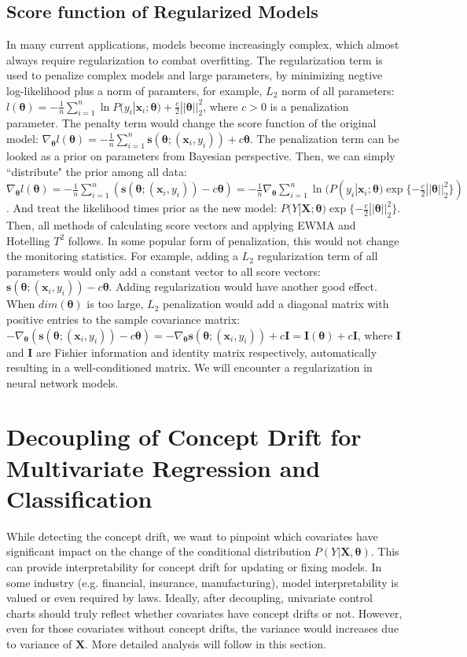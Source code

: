 \documentclass[twoside,11pt]{article}
\begin{document}
\subsection{Score function of Regularized Models}
\label{ss:score_regu}
In many current applications, models become increasingly complex, which almost always require regularization to combat overfitting. The regularization term is used to penalize complex models and large parameters, by minimizing negtive log-likelihood plus a norm of paramters, for example, $L_2$ norm of all parameters: $l(\bm{\theta})=-\frac{1}{n}\sum_{i=1}^n \ln P(y_i|\bm{x}_i;\bm{\theta})+\frac{c}{2}||\bm{\theta}||_2^2$, where $c>0$ is a penalization parameter. The penalty term would change the score function of the original model: $\nabla_{\bm{\theta}}l(\bm{\theta}) = -\frac{1}{n}\sum_{i=1}^n\bm{s}(\bm{\theta};(\bm{x}_i,y_i))+c\bm{\theta}$. The penalization term can be looked as a prior on parameters from Bayesian perspective. Then, we can simply ``distribute" the prior among all data: $\nabla_{\bm{\theta}}l(\bm{\theta})=-\frac{1}{n}\sum_{i=1}^n(\bm{s}(\bm{\theta};(\bm{x}_i,y_i))-c\bm{\theta})=-\frac{1}{n}\nabla_{\bm{\theta}}\sum_{i=1}^n\ln(P(y_i|\bm{x}_i;\bm{\theta})\exp\{-\frac{c}{2}||\bm{\theta}||_{2}^2\})$. And treat the likelihood times prior as the new model: $P(Y|\bm{X};\bm{\theta})\exp\{-\frac{c}{2}||\bm{\theta}||_{2}^2\}$. Then, all methods of calculating score vectors and applying EWMA and Hotelling $T^2$ follows. In some popular form of penalization, this would not change the monitoring statistics. For example, adding a $L_2$ regularization term of all parameters would only add a constant vector to all score vectors: $\bm{s}(\bm{\theta};(\bm{x}_i,y_i))-c\bm{\theta}$. Adding regularization would have another good effect. When $dim ( \bm { \theta})$ is too large, $L_2$ penalization would add a diagonal matrix with positive entries to the sample covariance matrix: $-\nabla_{\bm{\theta}}(\bm{s}(\bm{\theta};(\bm{x}_i,y_i))-c\bm{\theta})=-\nabla_{\bm{\theta}}\bm{s}(\bm{\theta};(\bm{x}_i,y_i))+c\bm{I}=\mathbf{I}(\bm{\theta})+c\bm{I}$, where $\mathbf{I}$ and $\bm{I}$ are Fishier information and identity matrix respectively, automatically resulting in a well-conditioned matrix. We will encounter a regularization in neural network models. 

\section{Decoupling of Concept Drift for Multivariate Regression and Classification}
\label{s:decou_cd}
While detecting the concept drift, we want to pinpoint which {covariates} have significant impact on the change of {the} conditional distribution {$P(Y| \bm {X}, \bm{\theta})$}. This can provide interpretability for concept drift for updating or fixing models. In some industry (e.g. financial, insurance, manufacturing), model interpretability is valued or even required by laws. Ideally, after decoupling, univariate control charts should truly reflect whether covariates have concept drifts or not. However, even for those covariates without concept drifts, the variance would increases due to variance of $\bm {X}$. More detailed analysis will follow in this section.
\end{document}
